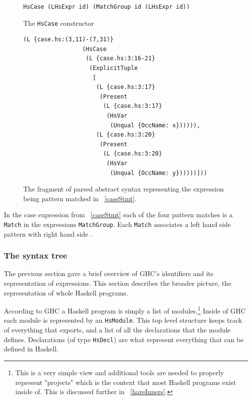 \begin{figure}[t]
\begin{lstlisting}
HsCase (LHsExpr id) (MatchGroup id (LHsExpr id))	
\end{lstlisting}
\caption{The \texttt{HsCase} constructor}
\label{hscase}
\end{figure}

\begin{figure}[t]
\begin{lstlisting}
(L {case.hs:(3,11)-(7,31)} 
                 (HsCase 
                  (L {case.hs:3:16-21} 
                   (ExplicitTuple 
                    [
                     (L {case.hs:3:17} 
                      (Present 
                       (L {case.hs:3:17} 
                        (HsVar 
                         (Unqual {OccName: x}))))),
                     (L {case.hs:3:20} 
                      (Present 
                       (L {case.hs:3:20} 
                        (HsVar 
                         (Unqual {OccName: y})))))]))
\end{lstlisting}
\caption{The fragment of parsed abstract syntax representing the expression being pattern matched in \DIFdelbeginFL {}\DIFdelendFL \DIFaddbeginFL {}\DIFaddendFL ~\ref{caseStmt}.}
\label{caseAST}
\end{figure}

In the case expression from \DIFdelbegin {}\DIFdelend \DIFaddbegin {}\DIFaddend ~\ref{caseStmt} each of the four pattern matches is a \texttt{Match} in the expressions \texttt{MatchGroup}. Each \texttt{Match} associates a left hand side pattern with \DIFdelbegin {}\DIFdelend \DIFaddbegin {}\DIFaddend right hand side \DIFdelbegin {}\DIFdelend \DIFaddbegin {}\DIFaddend . 

\subsubsection{The syntax tree}
The previous section gave a brief overview of GHC's identifiers and its representation of expressions. This section describes the broader picture, the representation of whole Haskell programs.  

According to \DIFdelbegin {}\DIFdelend GHC a Haskell program is simply a list of modules.\footnote{This is a very simple view and additional tools are needed to properly represent "projects" which is the context that most Haskell programs exist inside of. This is discussed further in \DIFdelbegin {}\DIFdelend \DIFaddbegin {}\DIFaddend ~\ref{hareInners}.} Inside of GHC each module is represented by an \texttt{HsModule}. This top level structure keeps track of everything that \DIFdelbegin {}\DIFdelend \DIFaddbegin {}\DIFaddend exports, and a list of all the declarations that the module defines. Declarations (of type \texttt{HsDecl}) are what represent everything that can be defined in Haskell. 

